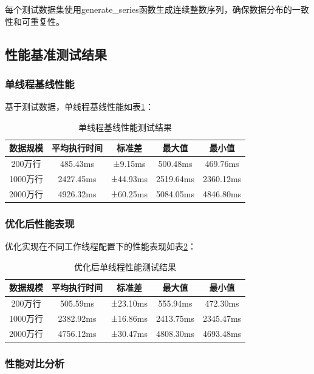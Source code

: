 每个测试数据集使用generate\_series函数生成连续整数序列，确保数据分布的一致性和可重复性。

\subsection{性能基准测试结果}

\subsubsection{单线程基线性能}

基于测试数据，单线程基线性能如表\ref{tab:baseline_performance}：

\begin{table}[htbp]
\centering
\caption{单线程基线性能测试结果}
\label{tab:baseline_performance}
\begin{tabular}{|c|c|c|c|c|}
\hline
数据规模 & 平均执行时间 & 标准差 & 最大值 & 最小值 \\
\hline
200万行 & 485.43ms & ±9.15ms & 500.48ms & 469.76ms \\
1000万行 & 2427.45ms & ±44.93ms & 2519.64ms & 2360.12ms \\
2000万行 & 4926.32ms & ±60.25ms & 5084.05ms & 4846.80ms \\
\hline
\end{tabular}
\end{table}

\subsubsection{优化后性能表现}

优化实现在不同工作线程配置下的性能表现如表\ref{tab:optimized_performance}：

\begin{table}[htbp]
\centering
\caption{优化后单线程性能测试结果}
\label{tab:optimized_performance}
\begin{tabular}{|c|c|c|c|c|}
\hline
数据规模 & 平均执行时间 & 标准差 & 最大值 & 最小值 \\
\hline
200万行 & 505.59ms & ±23.10ms & 555.94ms & 472.30ms \\
1000万行 & 2382.92ms & ±16.86ms & 2413.75ms & 2345.47ms \\
2000万行 & 4756.12ms & ±30.47ms & 4808.30ms & 4693.48ms \\
\hline
\end{tabular}
\end{table}

\subsubsection{性能对比分析}

